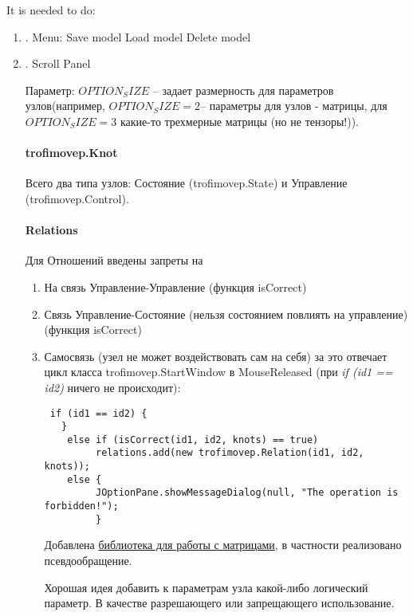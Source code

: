 \documentclass{article}
\begin{document}
\pagestyle{empty}

It is needed to do:
\begin{enumerate}
\item{.} Menu:
 Save model
 Load model
 Delete model

\item{.}  Scroll Panel

Параметр: $OPTION_SIZE$ -- задает размерность для параметров узлов(например, $OPTION_SIZE = 2$-- параметры для узлов - матрицы, для $OPTION_SIZE = 3$ какие-то трехмерные матрицы (но не тензоры!)).

\paragraph{trofimovep.Knot}
Всего два типа узлов: Состояние (trofimovep.State) и Управление (trofimovep.Control).


\paragraph{Relations} 
Для Отношений введены запреты на 
\begin{enumerate}
\item На связь Управление-Управление (функция isCorrect)
\item Связь Управление-Состояние (нельзя состоянием повлиять на управление) (функция isCorrect)
\item Самосвязь (узел не может воздействовать сам на себя) за это отвечает цикл класса trofimovep.StartWindow
в MouseReleased (при {\it{if (id1 == id2)}} ничего не происходит):
\begin{verbatim}
 if (id1 == id2) {
   }
    else if (isCorrect(id1, id2, knots) == true)
         relations.add(new trofimovep.Relation(id1, id2, knots));
    else {
         JOptionPane.showMessageDialog(null, "The operation is forbidden!");
         }
\end{verbatim}

Добавлена \href{http://javadox.com/com.googlecode.efficient-java-matrix-library/ejml/0.23/org/ejml/alg/dense/linsol/svd/SolvePseudoInverseSvd.html}{библиотека для работы с матрицами}, в частности реализовано псевдообращение.

Хорошая идея добавить к параметрам узла какой-либо логический параметр. В качестве разрешающего или запрещающего использование.

\end{enumerate}



\end{enumerate}
\end{document}
